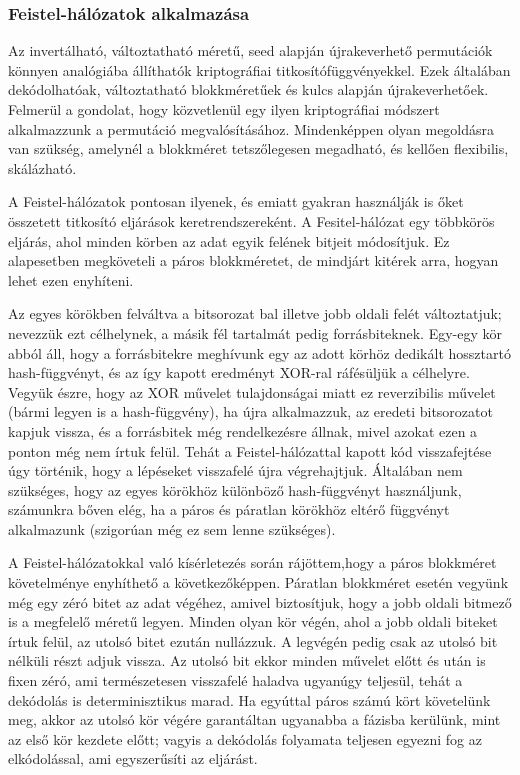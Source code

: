 \documentclass[
    parspace,
    noindent,
    nohyp,
]{elteiktdk}[2023/04/10]
\begin{document}
\subsubsection{Feistel-hálózatok alkalmazása}

Az invertálható, változtatható méretű, seed alapján újrakeverhető permutációk könnyen analógiába állíthatók kriptográfiai titkosítófüggvényekkel.
Ezek általában dekódolhatóak, változtatható blokkméretűek és kulcs alapján újrakeverhetőek.
Felmerül a gondolat, hogy közvetlenül egy ilyen kriptográfiai módszert alkalmazzunk a permutáció megvalósításához.
Mindenképpen olyan megoldásra van szükség, amelynél a blokkméret tetszőlegesen megadható, és kellően flexibilis, skálázható.

A Feistel-hálózatok pontosan ilyenek, és emiatt gyakran használják is őket összetett titkosító eljárások keretrendszereként.
A Fesitel-hálózat egy többkörös eljárás, ahol minden körben az adat egyik felének bitjeit módosítjuk.
Ez alapesetben megköveteli a páros blokkméretet, de mindjárt kitérek arra, hogyan lehet ezen enyhíteni.

Az egyes körökben felváltva a bitsorozat bal illetve jobb oldali felét változtatjuk; nevezzük ezt célhelynek, a másik fél tartalmát pedig forrásbiteknek.
Egy-egy kör abból áll, hogy a forrásbitekre meghívunk egy az adott körhöz dedikált hossztartó hash-függvényt,
és az így kapott eredményt XOR-ral ráfésüljük a célhelyre.
Vegyük észre, hogy az XOR művelet tulajdonságai miatt ez reverzibilis művelet (bármi legyen is a hash-függvény),
ha újra alkalmazzuk, az eredeti bitsorozatot kapjuk vissza,
és a forrásbitek még rendelkezésre állnak, mivel azokat ezen a ponton még nem írtuk felül.
Tehát a Feistel-hálózattal kapott kód visszafejtése úgy történik, hogy a lépéseket visszafelé újra végrehajtjuk.
Általában nem szükséges, hogy az egyes körökhöz különböző hash-függvényt használjunk,
számunkra bőven elég, ha a páros és páratlan körökhöz eltérő függvényt alkalmazunk (szigorúan még ez sem lenne szükséges).

A Feistel-hálózatokkal való kísérletezés során rájöttem,hogy a páros blokkméret követelménye enyhíthető a következőképpen.
Páratlan blokkméret esetén vegyünk még egy zéró bitet az adat végéhez,
amivel biztosítjuk, hogy a jobb oldali bitmező is a megfelelő méretű legyen.
Minden olyan kör végén, ahol a jobb oldali biteket írtuk felül, az utolsó bitet ezután nullázzuk.
A legvégén pedig csak az utolsó bit nélküli részt adjuk vissza.
Az utolsó bit ekkor minden művelet előtt és után is fixen zéró,
ami természetesen visszafelé haladva ugyanúgy teljesül, tehát a dekódolás is determinisztikus marad.
Ha egyúttal páros számú kört követelünk meg,
akkor az utolsó kör végére garantáltan ugyanabba a fázisba kerülünk, mint az első kör kezdete előtt;
vagyis a dekódolás folyamata teljesen egyezni fog az elkódolással, ami egyszerűsíti az eljárást.
\end{document}
